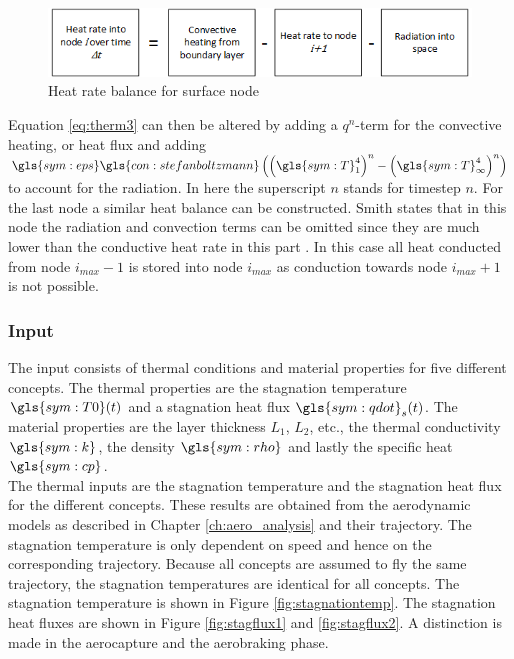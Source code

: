 \begin{figure}[H]
	\centering
	\includegraphics{Figure/thermblocknode2.png}
	\caption[Heat rate balance for surface node]{Heat rate balance for surface node \cite{Smith2011}}
	\label{fig:thermbalance2}
\end{figure}

Equation \eqref{eq:therm3} can then be altered by adding a $q^n$-term for the convective heating, or heat flux and adding  $\gls{sym:eps}\gls{con:stefanboltzmann}\left(\left(\gls{sym:T}_1^4\right)^n-\left(\gls{sym:T}_\infty^4\right)^n\right)$ to account for the radiation. In here the superscript $n$ stands for timestep $n$. For the last node a similar heat balance can be constructed. Smith states that in this node the radiation and convection terms can be omitted since they are much lower than the conductive heat rate in this part \cite{Smith2011}. In this case all heat conducted from node $i_{max}-1$ is stored into node $i_{max}$ as conduction towards node $i_{max}+1$ is not possible.


\subsubsection{Input}
The input consists of thermal conditions and material properties for five different concepts. The thermal properties are the stagnation temperature $ \gls{sym:T0}(t) $ and a stagnation heat flux $ \gls{sym:qdot}_s(t) $. The material properties are the layer thickness $ L_1 $, $ L_2 $, etc., the thermal conductivity $ \gls{sym:k} $, the density $ \gls{sym:rho} $ and lastly the specific heat $ \gls{sym:cp} $.\\

The thermal inputs are the stagnation temperature and the stagnation heat flux for the different concepts. These results are obtained from the aerodynamic models as described in Chapter \ref{ch:aero_analysis} and their trajectory. The stagnation temperature is only dependent on speed and hence on the corresponding trajectory. Because all concepts are assumed to fly the same trajectory, the stagnation temperatures are identical for all concepts. The stagnation temperature is shown in Figure \ref{fig:stagnationtemp}. The stagnation heat fluxes are shown in Figure \ref{fig:stagflux1} and \ref{fig:stagflux2}. A distinction is made in the aerocapture and the aerobraking phase.  \\

